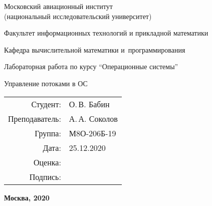 \begin{titlepage}
\begin{center}
\bfseries

{\Large Московский авиационный институт\\ (национальный исследовательский университет)}

\vspace{48pt}

{\large Факультет информационных технологий и прикладной математики
}

{\large Кафедра вычислительной математики и~программирования}


\vspace{48pt}

Лабораторная работа  по курсу \enquote{Операционные системы}

\vspace{24pt}

{\Large Управление потоками в ОС}

\end{center}

\vspace{72pt}

\begin{flushright}
\begin{tabular}{rl}
Студент: & О.\,В. Бабин \\
Преподаватель: & А.\,А. Соколов  \\
Группа: & М8О-206Б-19 \\
Дата: & 25.12.2020 \\
Оценка: & \\
Подпись: & \\
\end{tabular}
\end{flushright}

\vfill

\begin{center}
\bfseries
Москва, 2020
\end{center}
\end{titlepage}

\pagebreak
